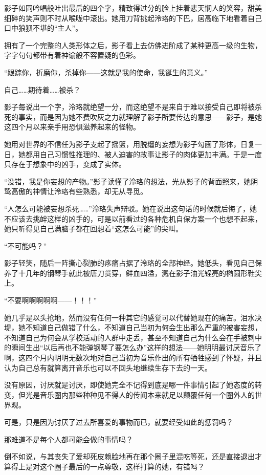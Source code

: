 \documentclass[UTF8, scheme = chinese, openany]{ctexbook}
\begin{document}
影子如同吟唱般吐出最后的四个字，精致得过分的脸上挂着悲天悯人的笑容，甜美细碎的笑声则不时从喉咙中滚出。她用刀背挑起泠珞的下巴，居高临下地看着自己口中狼狈不堪的“主人”。

拥有了一个完整的人类形体之后，影子看上去仿佛进阶成了某种更高一级的生物，字字句句都带有着神谕般不容置疑的色彩。

“跟踪你，折磨你，杀掉你——这就是我的使命，我诞生的意义。”

自己……期待着……被杀？

影子每说出一个字，泠珞就绝望一分，而这绝望不是来自于难以接受自己即将被杀死的事实，而是因为她不费吹灰之力就理解了影子所要传达的意思——影子，是她这四个月以来亲手用恐惧滋养起来的怪物。

她用对世界的不信任为影子支起了摇篮，用脱缰的妄想为影子勾画了形体，日复一日，她都用自己习惯性推理的、被人迫害的故事让影子的肉体更加丰满。于是一度只存在于想象中的凶手，变成了实体。

“没错，我是你妄想的产物。”影子读懂了泠珞的想法，光从影子的背面照来，她阴鸷高傲的神情让泠珞有些熟悉，却无从寻觅。

“人怎么可能被妄想杀死……”泠珞失声辩驳。她在说出这句话的时候就后悔了，她不应该去挑衅这样的凶手的，可是以前看过的各种危机自保方案一个也想不起来，她只听得见自己满脑子都在回想着“这怎么可能”的尖叫。

“不可能吗？”

影子轻笑，随后一阵撕心裂肺的疼痛占据了泠珞的全部神经。她低头，看见自己保养了十几年的钢琴手就此被唐刀贯穿，鲜血四溢，溅在影子油光锃亮的椭圆形鞋尖上。

“不要啊啊啊啊啊——！！！”

她几乎是以头抢地，然而没有任何一种其它的感觉可以代替她现在的痛苦。泪水决堤，她不知道自己做错了什么，不知道自己当初为何会生出那么严重的被害妄想，不知道自己为何会从学校活动的人群中走丢，甚至不知道自己为什么会在手被刺中的瞬间生出“以后再也不能弹钢琴了要怎么办”这样的想法——她明明最讨厌音乐了啊，这四个月内明明无数次地对自己当初为音乐作出的所有牺牲感到了怀疑，并且认为自己总有就算离开音乐也可以不回头地继续生存下去的一天。

没有原因，讨厌就是讨厌，即使她完全不记得到底是哪一件事情引起了她态度的转变，但光是音乐圈内那些种种见不得人的传闻本来就足以颠覆任何一个圈外人的世界观。

可是，只是因为讨厌了过去所喜爱的事物而已，就要经受如此的惩罚吗？

那难道不是每个人都可能会做的事情吗？

倒不如说，与其丧失了爱却死皮赖脸地再在那个圈子里混吃等死，还是直接退出才算得上是对这个圈子最后的一点尊敬，这样打算的她，有错吗？
\end{document}
